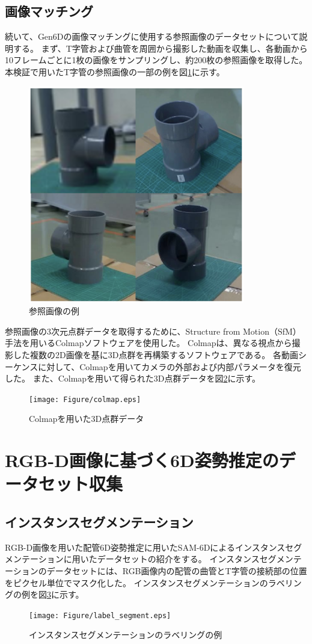 \subsection{画像マッチング}
続いて、Gen6Dの画像マッチングに使用する参照画像のデータセットについて説明する。
まず、T字管および曲管を周囲から撮影した動画を収集し、各動画から10フレームごとに1枚の画像をサンプリングし、約200枚の参照画像を取得した。
本検証で用いたT字管の参照画像の一部の例を図\ref{fig:4-f2}に示す。
\begin{figure}[htbt]
  \centering
   \includegraphics[height=95mm]{Figure/ref_images.eps}
   \caption{参照画像の例}
   \label{fig:4-f2}
\end{figure}

参照画像の3次元点群データを取得するために、Structure from Motion（SfM）手法を用いるColmapソフトウェアを使用した。
Colmapは、異なる視点から撮影した複数の2D画像を基に3D点群を再構築するソフトウェアである。
各動画シーケンスに対して、Colmapを用いてカメラの外部および内部パラメータを復元した。
また、Colmapを用いて得られた3D点群データを図\ref{fig:4-f3}に示す。
\begin{figure}[htbt]
  \centering
   \texttt{[image: Figure/colmap.eps]}
   \caption{Colmapを用いた3D点群データ}
   \label{fig:4-f3}
\end{figure}


\section{RGB-D画像に基づく6D姿勢推定のデータセット収集}
\subsection{インスタンスセグメンテーション}
RGB-D画像を用いた配管6D姿勢推定に用いたSAM-6Dによるインスタンスセグメンテーションに用いたデータセットの紹介をする。
インスタンスセグメンテーションのデータセットには、RGB画像内の配管の曲管とT字管の接続部の位置をピクセル単位でマスク化した。
インスタンスセグメンテーションのラベリングの例を図\ref{fig:4-f4}に示す。
\begin{figure}[htbt]
	\centering
	 \texttt{[image: Figure/label\_segment.eps]}
	 \caption{インスタンスセグメンテーションのラベリングの例}
	 \label{fig:4-f4}
\end{figure}

